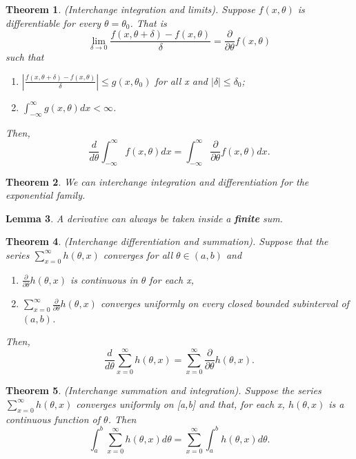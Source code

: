 \documentclass[twoside]{article}
\newcounter{lecnum}
\newtheorem{theorem}{Theorem}[lecnum]
\newtheorem{lemma}[theorem]{Lemma}
\begin{document}
\begin{theorem}(Interchange integration and limits). Suppose $f(x,\theta)$ is differentiable for every $\theta = \theta_0$. That is 
$$
\lim_{\delta \rightarrow 0}\frac{f(x,\theta + \delta) - f(x,\theta)}{\delta} = \frac{\partial}{\partial \theta}f(x,\theta)
$$
such that 
\begin{enumerate}
\item $|\frac{f(x,\theta + \delta) - f(x,\theta)}{\delta}| \leq g(x,\theta_0)$ for all x and $|\delta| \leq \delta_0$;
\item $\int_{-\infty}^{\infty}g(x,\theta)dx < \infty$.
\end{enumerate}
Then, 
$$
\frac{d}{d\theta}\int_{-\infty}^{\infty}f(x,\theta)dx = \int_{-\infty}^{\infty}\frac{\partial}{\partial \theta}f(x,\theta)dx.
$$

\end{theorem}

\begin{theorem}We can interchange integration and differentiation for the exponential family.
\end{theorem}

\begin{lemma}A derivative can always be taken inside a \textbf{finite} sum.
\end{lemma}

\begin{theorem}(Interchange differentiation and summation). Suppose that the series $\sum_{x=0}^{\infty}h(\theta,x)$ converges for all $\theta \in (a,b)$ and 
\begin{enumerate}
\item $\frac{\partial}{\partial \theta}h(\theta,x)$ is continuous in $\theta$ for each x, 
\item $\sum_{x=0}^{\infty}\frac{\partial}{\partial \theta}h(\theta,x)$ converges uniformly on every closed bounded subinterval of $(a,b)$.
\end{enumerate}
Then,
$$
\frac{d}{d\theta}\sum_{x=0}^{\infty}h(\theta,x) = \sum_{x=0}^{\infty}\frac{\partial}{\partial \theta}h(\theta,x).
$$
\end{theorem}

\begin{theorem}(Interchange summation and integration). Suppose the series $\sum_{x=0}^{\infty}h(\theta,x)$ converges uniformly on [a,b] and that, for each x, $h(\theta,x)$ is a continuous function of $\theta$. Then 
$$
\int_a^b\sum_{x=0}^{\infty}h(\theta,x)d\theta = \sum_{x=0}^{\infty}\int_a^bh(\theta,x)d\theta.
$$
\end{theorem}
\end{document}
